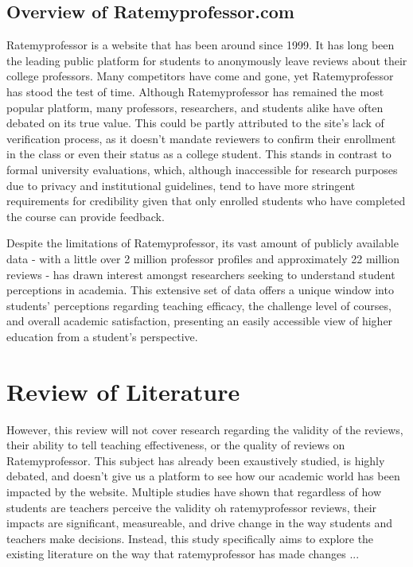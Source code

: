 \documentclass[doc, 12pt, twocolumn]{apa7}
\begin{document}
\subsection{Overview of Ratemyprofessor.com}
Ratemyprofessor is a website that has been around since 1999. It has long been the leading public platform for students to anonymously leave reviews about their college professors. Many competitors have come and gone, yet Ratemyprofessor has stood the test of time. Although Ratemyprofessor has remained the most popular platform, many professors, researchers, and students alike have often debated on its true value. This could be partly attributed to the site's lack of verification process, as it doesn't mandate reviewers to confirm their enrollment in the class or even their status as a college student. This stands in contrast to formal university evaluations, which, although inaccessible for research purposes due to privacy and institutional guidelines, tend to have more stringent requirements for credibility given that only enrolled students who have completed the course can provide feedback.

Despite the limitations of Ratemyprofessor, its vast amount of publicly available data - with a little over 2 million professor profiles and approximately 22 million reviews - has drawn interest amongst researchers seeking to understand student perceptions in academia. This extensive set of data offers a unique window into students' perceptions regarding teaching efficacy, the challenge level of courses, and overall academic satisfaction, presenting an easily accessible view of higher education from a student's perspective.

\section{Review of Literature}

However, this review will not cover research regarding the validity of the reviews, their ability to tell teaching effectiveness, or the quality of reviews on Ratemyprofessor. This subject has already been exaustively studied, is highly debated, and doesn't give us a platform to see how our academic world has been impacted by the website. Multiple studies have shown that regardless of how students are teachers perceive the validity oh ratemyprofessor reviews, their impacts are significant, measureable, and drive change in the way students and teachers make decisions. Instead, this study specifically aims to explore the existing literature on the way that ratemyprofessor has made changes ...
\end{document}

